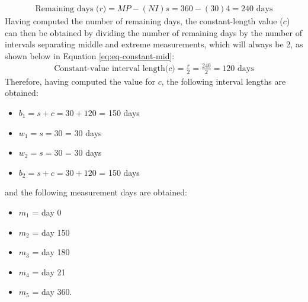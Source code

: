 \documentclass[
12pt, %
twoside,
english]{guelphthesis}
\begin{document}
\begin{align}
\text{Remaining days (} \textit{r})  = MP - (NI)s = 360 - (30)4 = 240 \text{ days}
  \label{eq:eq-remaining-mid} 
\end{align}
\noindent Having computed the number of remaining days, the constant-length value (\(c\)) can then be obtained by dividing the number of remaining days by the number of intervals separating middle and extreme measurements, which will always be 2, as shown below in Equation \ref{eq:eq-constant-mid}:
\begin{align}
\text{Constant-value interval length(} \textit{c}\text{)} = \frac{r}{2} = \frac{240}{2} = \text{120 days}
  \label{eq:eq-constant-mid} 
\end{align}
\noindent Therefore, having computed the value for \(c\), the following interval lengths are obtained:
\begin{itemize}
\tightlist
\item
  \(b_{1} = s + c = 30 + 120\) = 150 days
\item
  \(w_{1} = s = 30\) = 30 days
\item
  \(w_{2} = s = 30\) = 30 days
\item
  \(b_{2} = s + c = 30 + 120\) = 150 days
\end{itemize}
\noindent and the following measurement days are obtained:
\begin{itemize}
\tightlist
\item
  \(m_1\) = day 0
\item
  \(m_2\) = day 150
\item
  \(m_3\) = day 180
\item
  \(m_4\) = day 21
\item
  \(m_5\) = day 360.
\end{itemize}
\end{document}
